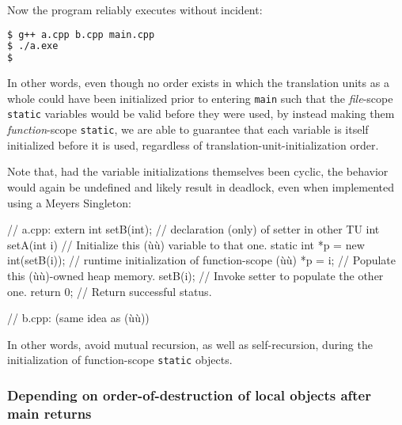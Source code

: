 \noindent Now the program reliably executes without incident:

\begin{lstlisting}[language=bash]
$ g++ a.cpp b.cpp main.cpp
$ ./a.exe
$
\end{lstlisting}

\noindent In other words, even though no order exists in which the translation
units as a whole could have been initialized prior to entering
\lstinline!main! such that the \emph{file}-scope \lstinline!static! variables
would be valid before they were used, by instead making them
\emph{function}-scope \lstinline!static!, we are able to guarantee that
each variable is itself initialized before it is used, regardless of
translation-unit-initialization order.

Note that, had the variable initializations themselves been cyclic, the
behavior would again be undefined and likely result in deadlock, even
when implemented using a Meyers Singleton:

\begin{emcppslisting}
// a.cpp:
extern int setB(int);  // declaration (only) of setter in other TU
int setA(int i)        // Initialize this (ù{}ù) variable to that one.
{
    static int *p =
            new int(setB(i)); // runtime initialization of function-scope (ù{}ù)
    *p = i;                   // Populate this (ù{}ù)-owned heap memory.
    setB(i);                  // Invoke setter to populate the other one.
    return 0;                 // Return successful status.
}

// b.cpp: (same idea as (ù{}ù))
\end{emcppslisting}

\noindent In other words, avoid mutual recursion, as well as self-recursion,
during the initialization of function-scope \lstinline!static! objects.

\subsubsection[Depending on order-of-destruction of local objects after {\tt main} returns]{Depending on order-of-destruction of local objects after {\SubsubsecCode main} returns}\label{depending-on-order-of-destruction-of-local-objects-after-main-returns}

